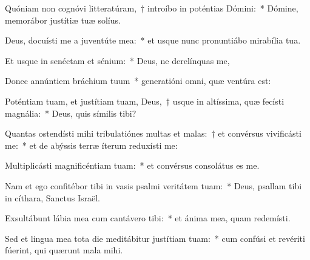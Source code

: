 \item Quóniam non cognóvi litteratúram,~† introíbo in poténtias Dómini:~* Dómine, memorábor justítiæ tuæ solíus.

\item Deus, docuísti me a juventúte mea:~* et usque nunc pronuntiábo mirabília tua.

\item Et usque in senéctam et sénium:~* Deus, ne derelínquas me,

\item Donec annúntiem bráchium tuum~* generatióni omni, quæ ventúra est:

\item Poténtiam tuam, et justítiam tuam, Deus,~† usque in altíssima, quæ fecísti magnália:~* Deus, quis símilis tibi?

\item Quantas ostendísti mihi tribulatiónes multas et malas:~† et convérsus vivificásti me:~* et de abýssis terræ íterum reduxísti me:

\item Multiplicásti magnificéntiam tuam:~* et convérsus consolátus es me.

\item Nam et ego confitébor tibi in vasis psalmi veritátem tuam:~* Deus, psallam tibi in cíthara, Sanctus Israël.

\item Exsultábunt lábia mea cum cantávero tibi:~* et ánima mea, quam redemísti.

\item Sed et lingua mea tota die meditábitur justítiam tuam:~* cum confúsi et revériti fúerint, qui quærunt mala mihi.

